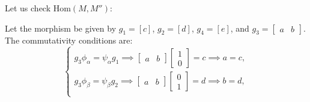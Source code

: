 \documentclass[11pt, a4paper]{report}
\begin{document}
\begin{example}
    Let us check $\mathrm{Hom}(M,M'')$:
    \begin{center}
    \end{center}
    Let the morphism be given by $g_1 = [c]$, $g_2 = [d]$, $g_4 = [e]$, and $g_3 = \begin{bmatrix} a & b \end{bmatrix}$. The commutativity conditions are:
    \[
        \begin{cases}
            g_3 \phi_\alpha = \psi_\alpha g_1 \implies \begin{bmatrix} a & b \end{bmatrix} \begin{bmatrix} 1 \\ 0 \end{bmatrix} = c \implies a = c, \\
            g_3 \phi_\beta = \psi_\beta g_2 \implies \begin{bmatrix} a & b \end{bmatrix} \begin{bmatrix} 0 \\ 1 \end{bmatrix} = d \implies b = d,   \\

\end{cases}\]
\end{example}
\end{document}
